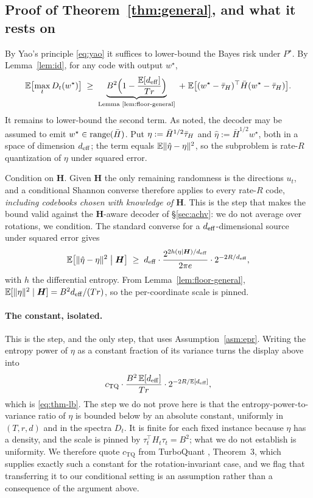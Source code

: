 \subsection{Proof of Theorem~\ref{thm:general}, and what it rests on}

By Yao's principle \eqref{eq:yao} it suffices to lower-bound the Bayes risk
under $P^\star$. By Lemma~\ref{lem:id}, for any code with output $w^\star$,
\begin{equation*}
  \mathbb{E}\bigl[\max_t D_t(w^\star)\bigr]
  \;\geq\;
  \underbrace{B^2\Bigl(1 - \frac{\mathbb{E}[d_{\mathrm{eff}}]}{Tr}\Bigr)}_{\text{Lemma
  \ref{lem:floor-general}}}
  \;+\;
  \mathbb{E}\bigl[(w^\star-\bar{\tau}_H)^\top \bar H (w^\star-\bar{\tau}_H)\bigr].
\end{equation*}
It remains to lower-bound the second term. As noted, the decoder may be
assumed to emit $w^\star \in \operatorname{range}(\bar H)$. Put
$\eta := \bar H^{1/2}\bar{\tau}_H$ and $\hat\eta := \bar H^{1/2} w^\star$, both in a
space of dimension $d_{\mathrm{eff}}$; the term equals $\mathbb{E}\|\hat\eta - \eta\|^2$, so the
subproblem is rate-$R$ quantization of $\eta$ under squared error.

Condition on $\boldsymbol H$. Given $\boldsymbol H$ the only remaining
randomness is the directions $u_t$, and a conditional Shannon converse
therefore applies to every rate-$R$ code, \emph{including codebooks chosen
with knowledge of $\boldsymbol H$}. This is the step that makes the bound valid
against the $\boldsymbol H$-aware decoder of \S\ref{sec:achv}: we do not
average over rotations, we condition. The standard converse for a
$d_{\mathrm{eff}}$-dimensional source under squared error gives
\begin{equation*}
  \mathbb{E}\bigl[\|\hat\eta - \eta\|^2 \bigm| \boldsymbol H\bigr]
  \;\geq\; d_{\mathrm{eff}} \cdot \frac{2^{2h(\eta \mid \boldsymbol H)/d_{\mathrm{eff}}}}
  {2\pi e}\cdot 2^{-2R/d_{\mathrm{eff}}},
\end{equation*}
with $h$ the differential entropy. From Lemma~\ref{lem:floor-general},
$\mathbb{E}[\|\eta\|^2 \mid \boldsymbol H] = B^2d_{\mathrm{eff}}/(Tr)$, so the per-coordinate
scale is pinned.

\paragraph{The constant, isolated.} This is the step, and the only step, that
uses Assumption~\ref{asm:epr}. Writing the entropy power of $\eta$ as a
constant fraction of its variance turns the display above into
\begin{equation*}
  c_{\mathrm{TQ}}\cdot \frac{B^2\,\mathbb{E}[d_{\mathrm{eff}}]}{Tr}\cdot 2^{-2R/\mathbb{E}[d_{\mathrm{eff}}]},
\end{equation*}
which is \eqref{eq:thm-lb}. The step we do not prove here is that the
entropy-power-to-variance ratio of $\eta$ is bounded below by an absolute
constant, uniformly in $(T, r, d)$ and in the spectra $D_t$. It is finite for
each fixed instance because $\eta$ has a density, and the scale is pinned by
$\tau_t^\top H_t\tau_t = B^2$; what we do not establish is uniformity. We
therefore quote $c_{\mathrm{TQ}}$ from TurboQuant
\citep{zandieh2025turboquant}, Theorem~3, which supplies exactly such a
constant for the rotation-invariant case, and we flag that transferring it to
our conditional setting is an assumption rather than a consequence of the
argument above.

